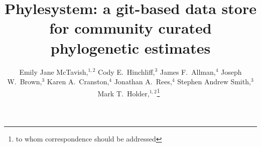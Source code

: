 \documentclass{bioinfo}
\begin{document}
\title[phylesystem git phylostore]{Phylesystem: a git-based data store for community curated phylogenetic estimates}

\author[McTavish\textit{et~al}]{
    Emily Jane McTavish,$^{1,2}$
    Cody E.~Hinchliff,${^3}$
    James F.~Allman,${^4}$
    Joseph W.~Brown,${^3}$
    Karen A.~Cranston,${^4}$
    Jonathan A.~Rees,${^4}$
    Stephen Andrew Smith,${^3}$
    Mark T.~Holder,$^{1,2}$\footnote{to whom correspondence should be addressed}~
}
\address{$^{1}$Department of Ecology and Evolutionary Biology, University of Kansas, Lawrence KS, USA\\
$^{2}$Heidelberg Institute of Theoretical Studies, Heidelberg, Germany \\
$^{3}$Department of Ecology and Evolutionary Biology, University of Michigan, Ann Arbor, Michigan, USA\\
$^{4}$National Evolutionary Synthesis Center, Duke University, Durham, North Carolina, USA}


\maketitle
\end{document}
